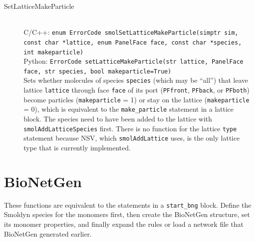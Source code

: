 \documentclass {scrbook}
\newcommand {\ttt} {\texttt}
\begin{document}
\begin{description}
\item[SetLatticeMakeParticle]
\hfill \\
C/C++: \ttt{enum ErrorCode smolSetLatticeMakeParticle(simptr sim, const char *lattice, enum PanelFace face, const char *species, int makeparticle)}\\
Python: \ttt{ErrorCode setLatticeMakeParticle(str lattice, PanelFace face, str species, bool makeparticle=True)}\\
Sets whether molecules of species \ttt{species} (which may be ``all'') that leave lattice \ttt{lattice} through face \ttt{face} of its port (\ttt{PFfront}, \ttt{PFback}, or \ttt{PFboth}) become particles (\ttt{makeparticle} = 1) or stay on the lattice (\ttt{makeparticle} = 0), which is equivalent to the \ttt{make\_particle} statement in a lattice block. The species need to have been added to the lattice with \ttt{smolAddLatticeSpecies} first. There is no function for the lattice \ttt{type} statement because NSV, which \ttt{smolAddLattice} uses, is the only lattice type that is currently implemented.

\end{description}

\section{BioNetGen}

These functions are equivalent to the statements in a \ttt{start\_bng} block. Define the Smoldyn species for the monomers first, then create the BioNetGen structure, set its monomer properties, and finally expand the rules or load a network file that BioNetGen generated earlier.
\end{document}
